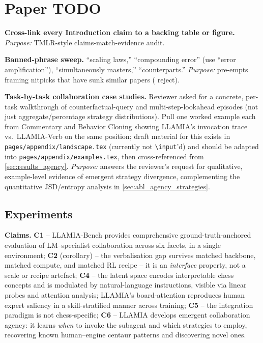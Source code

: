 \section{Paper TODO}

    \item \textbf{Cross-link every Introduction claim to a backing
    table or figure.}
    \emph{Purpose:} TMLR-style claims-match-evidence audit.

\label{sec:todo}
    \item \textbf{Banned-phrase sweep.} ``scaling laws,'' ``compounding
    error'' (use ``error amplification''), ``simultaneously masters,''
    ``counterparts.''
    \emph{Purpose:} pre-empts framing nitpicks that have sunk similar
    papers (\cite{DiffuSearch-A9y3LFX4ds} reject).

\item \textbf{Task-by-task collaboration case studies.} Reviewer asked for a
concrete, per-task walkthrough of counterfactual-query and multi-step-lookahead
episodes (not just aggregate/percentage strategy distributions). Pull one
worked example each from Commentary and Behavior Cloning showing LLAMIA's
invocation trace vs.\ LLAMIA-Verb on the same position; draft material for
this exists in \texttt{pages/appendix/landscape.tex} (currently not
\texttt{\textbackslash input}'d) and should be adapted into
\texttt{pages/appendix/examples.tex}, then cross-referenced from
\cref{sec:results_agency}.
\emph{Purpose:} answers the reviewer's request for qualitative,
example-level evidence of emergent strategy divergence, complementing the
quantitative JSD/entropy analysis in \cref{sec:abl_agency_strategies}.

\subsection{Experiments}
\label{sec:todo_experiments}

\textbf{Claims.}
\textbf{C1} -- LLAMIA-Bench provides comprehensive ground-truth-anchored
evaluation of LM--specialist collaboration across six facets, in a
single environment;
\textbf{C2} (corollary) -- the verbalisation gap survives matched
backbone, matched compute, and matched RL recipe -- it is an
\emph{interface} property, not a scale or recipe artefact;
\textbf{C4} -- the latent space encodes interpretable chess concepts and is
modulated by natural-language instructions, visible via linear probes and
attention analysis; LLAMIA's board-attention reproduces human expert
saliency in a skill-stratified manner across training;
\textbf{C5} -- the integration paradigm is not chess-specific;
\textbf{C6} -- LLAMIA develops emergent collaboration agency: it learns
\emph{when} to invoke the subagent and which strategies to employ,
recovering known human--engine centaur patterns and discovering novel ones.

